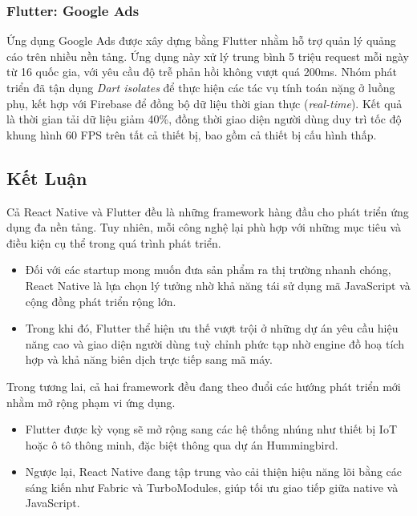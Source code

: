 \subsubsection{Flutter: Google Ads}
\begin{flushleft}
  \hspace*{0.8cm}Ứng dụng Google Ads được xây dựng bằng Flutter nhằm hỗ trợ quản lý quảng cáo trên nhiều nền tảng. Ứng dụng này xử lý trung bình 5 triệu request mỗi ngày từ 16 quốc gia, với yêu cầu độ trễ phản hồi không vượt quá 200ms. Nhóm phát triển đã tận dụng \textit{Dart isolates} để thực hiện các tác vụ tính toán nặng ở luồng phụ, kết hợp với Firebase để đồng bộ dữ liệu thời gian thực (\textit{real-time}). Kết quả là thời gian tải dữ liệu giảm 40\%, đồng thời giao diện người dùng duy trì tốc độ khung hình 60 FPS trên tất cả thiết bị, bao gồm cả thiết bị cấu hình thấp.
\end{flushleft}

\subsection{Kết Luận}
\renewcommand{\labelitemi}{--}    
\begin{flushleft}
  \hspace*{0.8cm}Cả React Native và Flutter đều là những framework hàng đầu cho phát triển ứng dụng đa nền tảng. Tuy nhiên, mỗi công nghệ lại phù hợp với những mục tiêu và điều kiện cụ thể trong quá trình phát triển.
  
  \setlength{\leftmargini}{1.5cm}
  \begin{itemize}
    \item Đối với các startup mong muốn đưa sản phẩm ra thị trường nhanh chóng, React Native là lựa chọn lý tưởng nhờ khả năng tái sử dụng mã JavaScript và cộng đồng phát triển rộng lớn.
    \item Trong khi đó, Flutter thể hiện ưu thế vượt trội ở những dự án yêu cầu hiệu năng cao và giao diện người dùng tuỳ chỉnh phức tạp nhờ engine đồ hoạ tích hợp và khả năng biên dịch trực tiếp sang mã máy.
  \end{itemize}
\end{flushleft}

\begin{flushleft}
  \hspace*{0.8cm}Trong tương lai, cả hai framework đều đang theo đuổi các hướng phát triển mới nhằm mở rộng phạm vi ứng dụng.

  \setlength{\leftmargini}{1.5cm}
  \begin{itemize}
    \item Flutter được kỳ vọng sẽ mở rộng sang các hệ thống nhúng như thiết bị IoT hoặc ô tô thông minh, đặc biệt thông qua dự án Hummingbird.
    \item Ngược lại, React Native đang tập trung vào cải thiện hiệu năng lõi bằng các sáng kiến như Fabric và TurboModules, giúp tối ưu giao tiếp giữa native và JavaScript.
  \end{itemize}
\end{flushleft}

